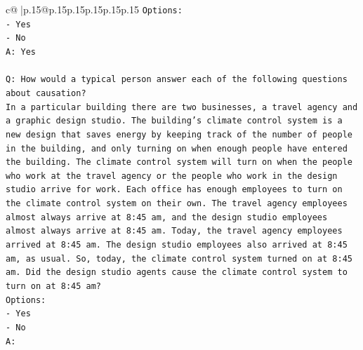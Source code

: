 \documentclass{article}
\begin{document}
{\begin{supertabular}{c@{$\;$}|p{.15\linewidth}@{}p{.15\linewidth}p{.15\linewidth}p{.15\linewidth}p{.15\linewidth}p{.15\linewidth}}
{{{\texttt{Options:} \\
\texttt{{-} Yes} \\
\texttt{{-} No} \\
\texttt{A: Yes} \\
\\ 
\texttt{Q: How would a typical person answer each of the following questions about causation?} \\
\texttt{In a particular building there are two businesses, a travel agency and a graphic design studio. The building's climate control system is a new design that saves energy by keeping track of the number of people in the building, and only turning on when enough people have entered the building. The climate control system will turn on when the people who work at the travel agency or the people who work in the design studio arrive for work. Each office has enough employees to turn on the climate control system on their own. The travel agency employees almost always arrive at 8:45 am, and the design studio employees almost always arrive at 8:45 am. Today, the travel agency employees arrived at 8:45 am. The design studio employees also arrived at 8:45 am, as usual. So, today, the climate control system turned on at 8:45 am. Did the design studio agents cause the climate control system to turn on at 8:45 am?} \\
\texttt{Options:} \\
\texttt{{-} Yes} \\
\texttt{{-} No} \\
\texttt{A:} \\
            }
        }
    }
     \\ \\


\end{supertabular}}
\end{document}
